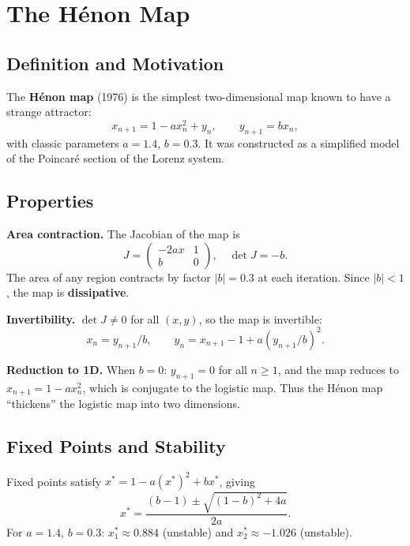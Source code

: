 \documentclass[11pt,letterpaper]{article}
\theoremstyle{definition}
\theoremstyle{plain}
\theoremstyle{remark}
\begin{document}
\section{The H\'enon Map}\label{sec:henon}

\subsection{Definition and Motivation}

The \textbf{H\'enon map} (1976) is the simplest two-dimensional map
known to have a strange attractor:
\begin{equation}\label{eq:henon}
  x_{n+1} = 1 - ax_n^2 + y_n, \qquad y_{n+1} = bx_n,
\end{equation}
with classic parameters $a = 1.4$, $b = 0.3$.  It was constructed as a
simplified model of the Poincar\'e section of the Lorenz system.

\subsection{Properties}

\textbf{Area contraction.}  The Jacobian of the map is
\[
  J = \begin{pmatrix} -2ax & 1 \\ b & 0 \end{pmatrix},
  \quad \det J = -b.
\]
The area of any region contracts by factor $|b| = 0.3$ at each iteration.
Since $|b| < 1$, the map is \textbf{dissipative}.

\textbf{Invertibility.}  $\det J \neq 0$ for all $(x,y)$, so the map
is invertible:
\[
  x_n = y_{n+1}/b, \qquad y_n = x_{n+1} - 1 + a(y_{n+1}/b)^2.
\]

\textbf{Reduction to 1D.}  When $b = 0$: $y_{n+1} = 0$ for all $n \ge 1$,
and the map reduces to $x_{n+1} = 1 - ax_n^2$, which is conjugate to
the logistic map.  Thus the Hénon map ``thickens'' the logistic map
into two dimensions.

\subsection{Fixed Points and Stability}

Fixed points satisfy $x^* = 1 - a(x^*)^2 + bx^*$, giving
\[
  x^* = \frac{(b-1) \pm \sqrt{(1-b)^2 + 4a}}{2a}.
\]
For $a=1.4$, $b=0.3$:
$x^*_1 \approx 0.884$ (unstable) and $x^*_2 \approx -1.026$ (unstable).
\end{document}
